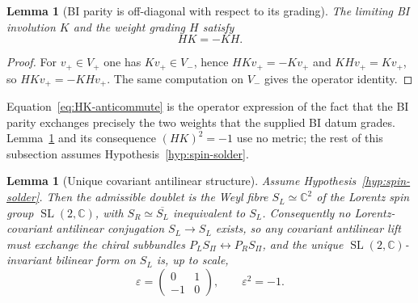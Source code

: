 \documentclass[11pt,a4paper]{article}
\newtheorem{lemma}[theorem]{Lemma}
\theoremstyle{definition}
\theoremstyle{remark}
\newcommand{\SL}{\operatorname{SL}}
\begin{document}
    \begin{lemma}[BI parity is off-diagonal with respect to its grading]
      \label{lem:bi-grading-anticommute}
      The limiting BI involution $K$ and the weight grading $H$ satisfy
      \begin{equation}
        \label{eq:HK-anticommute}
        H K = - K H .
      \end{equation}
    \end{lemma}

    \begin{proof}
      For $v_+ \in V_+$ one has $K v_+ \in V_-$, hence $H K v_+ = - K v_+$ and $K H v_+ = K v_+$,
      so $H K v_+ = - K H v_+$.
      The same computation on $V_-$ gives the operator identity.
    \end{proof}

    Equation~\eqref{eq:HK-anticommute} is the operator expression of the fact that the BI parity
    exchanges precisely the two weights that the supplied BI datum grades.
    Lemma~\ref{lem:bi-grading-anticommute} and its consequence $(HK)^2 = -1$ use no metric; the rest
    of this subsection assumes Hypothesis~\ref{hyp:spin-solder}.

    \begin{lemma}[Unique covariant antilinear structure]
      \label{lem:covariant-epsilon}
      Assume Hypothesis~\ref{hyp:spin-solder}.
      Then the admissible doublet is the Weyl fibre $S_L \simeq \mathbb{C}^2$ of the Lorentz spin group
      $\SL(2,\mathbb{C})$, with $S_R \simeq \overline{S_L}$ inequivalent to $S_L$.
      Consequently no Lorentz-covariant antilinear conjugation $S_L \to S_L$ exists, so any
      covariant antilinear lift must exchange the chiral subbundles
      $P_L S_\Pi \leftrightarrow P_R S_\Pi$, and the unique $\SL(2,\mathbb{C})$-invariant bilinear
      form on $S_L$ is, up to scale,
      \[
        \varepsilon =
        \begin{pmatrix} 0 & 1 \\ -1 & 0 \end{pmatrix},
        \qquad
        \varepsilon^2 = -1 .
      \]
    \end{lemma}
\end{document}
